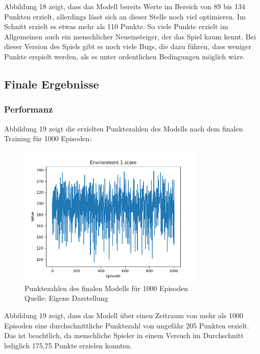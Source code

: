 Abbildung 18 zeigt, dass das Modell bereits Werte im Bereich von 89 bis 134 Punkten erzielt, allerdings lässt sich an dieser Stelle noch viel optimieren. Im Schnitt erzielt es etwas mehr als 110 Punkte. So viele Punkte erzielt im Allgemeinen auch ein menschlicher Neueinsteiger, der das Spiel kaum kennt. Bei dieser Version des Spiels gibt es noch viele Bugs, die dazu führen, dass weniger Punkte erspielt werden, als es unter ordentlichen Bedingungen möglich wäre.
\subsection{Finale Ergebnisse}
\subsubsection{Performanz}
Abbildung 19 zeigt die erzielten Punktezahlen des Modells nach dem finalen Training für 1000 Episoden:
\nopagebreak
\begin{figure}[H]
	\centering
	\includegraphics[width=0.8\textwidth]{Bilder/maskableppo_ganzschoenclever_193avg_v3.1} 
	\caption[Punktezahlen des finalen Modells für 1000 Episoden]{Punktezahlen des finalen Modells für 1000 Episoden\\ Quelle: Eigene Darstellung}
\end{figure}

Abbildung 19 zeigt, dass das Modell über einen Zeitraum von mehr als 1000 Episoden eine durchschnittliche Punktezahl von ungefähr 205 Punkten erzielt. Das ist beachtlich, da menschliche Spieler in einem Versuch im Durchschnitt lediglich 175,75 Punkte erzielen konnten.\\

